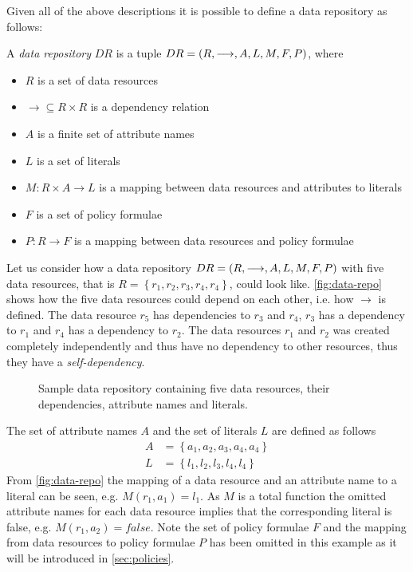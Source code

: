 Given all of the above descriptions it is possible to define a data repository as follows:
\begin{definition}
A \emph{data repository} $DR$ is a tuple $DR= \left( R, \longrightarrow, A, L, M, F, P \right)$, where
\begin{itemize}
  \item $R$ is a set of data resources
  \item $\longrightarrow \subseteq R \times R$ is a dependency relation
  \item $A$ is a finite set of attribute names
  \item $L$ is a set of literals
  \item $M : R \times A \rightarrow L$ is a mapping between data resources and attributes to literals
  \item $F$ is a set of policy formulae
  \item $P : R \rightarrow F$ is a mapping between data resources and policy formulae
\end{itemize}
\end{definition}

\begin{example}\label{ex:data-repo}
Let us consider how a data repository $DR= \left( R, \longrightarrow, A, L, M, F, P \right)$ with five data resources, that is $R = \left\{ r_1, r_2, r_3, r_4, r_4 \right\}$, could look like. \autoref{fig:data-repo} shows how the five data resources could depend on each other, i.e. how $\longrightarrow$ is defined. The data resource $r_5$ has dependencies to $r_3$ and $r_4$, $r_3$ has a dependency to $r_1$ and $r_4$ has a dependency to $r_2$. The data resources $r_1$ and $r_2$ was created completely independently and thus have no dependency to other resources, thus they have a \emph{self-dependency}.
\begin{figure}[!ht] 
    \begin{center}
        
        \caption{Sample data repository containing five data resources, their dependencies, attribute names and literals.}
        \label{fig:data-repo}
    \end{center}
\end{figure}
The set of attribute names $A$ and the set of literals $L$ are defined as follows
\begin{align*}
    A &= \left\{ a_1, a_2, a_3, a_4, a_4 \right\} \\
    L &= \left\{ l_1, l_2, l_3, l_4, l_4 \right\}
\end{align*}
From \autoref{fig:data-repo} the mapping of a data resource and an attribute name to a literal can be seen, e.g. $M(r_1, a_1) = l_1$. As $M$ is a total function the omitted attribute names for each data resource implies that the corresponding literal is false, e.g. $M(r_1, a_2) = false$. Note the set of policy formulae $F$ and the mapping from data resources to policy formulae $P$ has been omitted in this example as it will be introduced in \autoref{sec:policies}.
\end{example}

